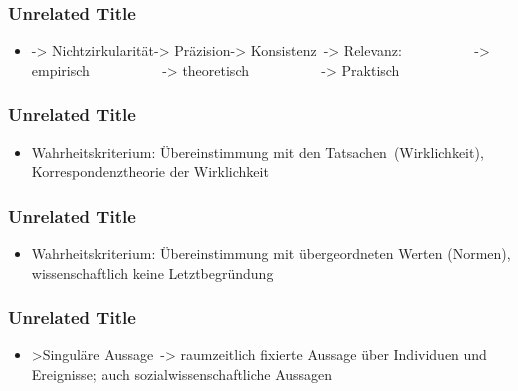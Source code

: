 \documentclass[
    11pt,
    aspectratio=169,
]{beamer}
\begin{document}
\begin{frame}
\frametitle{Unrelated Title}


\begin{itemize}
\item -> Nichtzirkularität-> Präzision-> Konsistenz -> Relevanz:            -> empirisch            -> theoretisch            -> Praktisch  
\end{itemize}

\note[item]{}
\end{frame}
\begin{frame}
\frametitle{Unrelated Title}


\begin{itemize}
\item Wahrheitskriterium: Übereinstimmung mit den Tatsachen (Wirklichkeit), Korrespondenztheorie der Wirklichkeit 
\end{itemize}

\note[item]{}
\end{frame}
\begin{frame}
\frametitle{Unrelated Title}


\begin{itemize}
\item Wahrheitskriterium: Übereinstimmung mit übergeordneten Werten (Normen), wissenschaftlich keine Letztbegründung 
\end{itemize}

\note[item]{}
\end{frame}
\begin{frame}
\frametitle{Unrelated Title}


\begin{itemize}
\item >Singuläre Aussage -> raumzeitlich fixierte Aussage über Individuen und Ereignisse; auch sozialwissenschaftliche Aussagen 
\end{itemize}

\note[item]{}
\end{frame}
\end{document}
